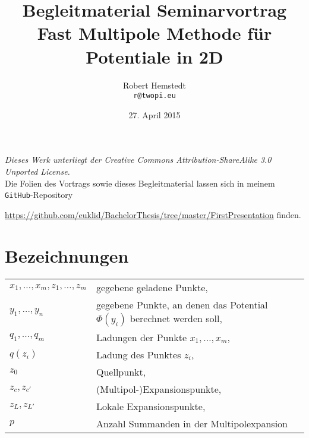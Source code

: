 \documentclass[11pt,a4paper]{article}
\author{Robert Hemstedt \\ \texttt{r@twopi.eu}}
\date{27. April 2015}
\title{Begleitmaterial Seminarvortrag Fast Multipole Methode für Potentiale in 2D}
\theoremstyle{plain}
\numberwithin{equation}{section}
\begin{document}
\maketitle
\textit{Dieses Werk unterliegt der Creative Commons Attribution-ShareAlike 3.0 Unported License.}\\
Die Folien des Vortrags sowie dieses Begleitmaterial lassen sich in meinem \texttt{GitHub}-Repository \\ {\url{https://github.com/euklid/BachelorThesis/tree/master/FirstPresentation} finden.
\section{Bezeichnungen}
\begin{tabular}{ll}
$x_1,\ldots,x_m,  z_1,\ldots,z_m$  & gegebene geladene Punkte, \\
$y_1,\ldots,y_n$  & gegebene Punkte, an denen das Potential $\Phi(y_i)$ berechnet werden soll, \\
$q_1,\ldots, q_m$  & Ladungen der Punkte $x_1,\ldots,x_m$, \\
$q(z_i)$ & Ladung des Punktes $z_i$, \\
$z_0$ & Quellpunkt, \\
$z_c, z_{c'}$ & (Multipol-)Expansionspunkte, \\
$z_L, z_{L'}$ & Lokale Expansionspunkte,\\
$p$ & Anzahl Summanden in der Multipolexpansion
\end{tabular}
}
\end{document}
